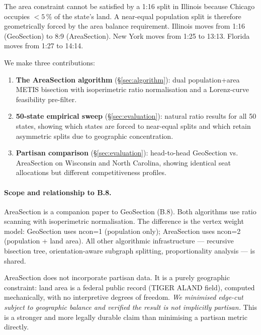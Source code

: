 The area constraint cannot be satisfied by a 1:16 split in Illinois because
Chicago occupies $<5$\,\% of the state's land.
A near-equal population split is therefore geometrically forced by the area
balance requirement.
Illinois moves from 1:16 (GeoSection) to 8:9 (AreaSection).
New York moves from 1:25 to 13:13.
Florida moves from 1:27 to 14:14.

We make three contributions:

\begin{enumerate}
\item \textbf{The AreaSection algorithm} (\S\ref{sec:algorithm}): dual
  population+area METIS bisection with isoperimetric ratio normalisation and
  a Lorenz-curve feasibility pre-filter.

\item \textbf{50-state empirical sweep} (\S\ref{sec:evaluation}): natural
  ratio results for all 50 states, showing which states are forced to near-equal
  splits and which retain asymmetric splits due to geographic concentration.

\item \textbf{Partisan comparison} (\S\ref{sec:evaluation}): head-to-head
  GeoSection vs. AreaSection on Wisconsin and North Carolina, showing identical
  seat allocations but different competitiveness profiles.
\end{enumerate}

\paragraph{Scope and relationship to B.8.}
AreaSection is a companion paper to GeoSection (B.8).
Both algorithms use ratio scanning with isoperimetric normalisation.
The difference is the vertex weight model: GeoSection uses ncon=1
(population only); AreaSection uses ncon=2 (population + land area).
All other algorithmic infrastructure --- recursive bisection tree,
orientation-aware subgraph splitting, proportionality analysis --- is shared.

AreaSection does not incorporate partisan data.
It is a purely geographic constraint: land area is a federal public record
(TIGER ALAND field), computed mechanically, with no interpretive degrees of
freedom.
\emph{We minimised edge-cut subject to geographic balance and verified the
result is not implicitly partisan.} This is a stronger and more legally durable
claim than minimising a partisan metric directly.
